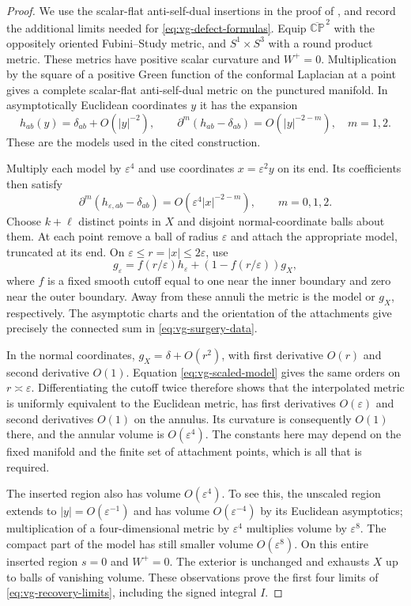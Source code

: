 \begin{proof}
We use the scalar-flat anti-self-dual insertions in the proof of
\cite[Theorem~4.3]{LeBrun2001}, and record the additional limits needed
for \eqref{eq:vg-defect-formulas}.  Equip
$\overline{\mathbb{CP}}^{\,2}$ with the oppositely oriented Fubini--Study
metric, and $S^1\times S^3$ with a round product metric.  These metrics
have positive scalar curvature and $W^+=0$.  Multiplication by the square
of a positive Green function of the conformal Laplacian at a point gives
a complete scalar-flat anti-self-dual metric on the punctured manifold.
In asymptotically Euclidean coordinates $y$ it has the expansion
\[
 h_{ab}(y)=\delta_{ab}+O(|y|^{-2}),\qquad
 \partial^m(h_{ab}-\delta_{ab})=O(|y|^{-2-m}),\quad m=1,2.
\]
These are the models used in the cited construction.

Multiply each model by $\varepsilon^4$ and use coordinates
$x=\varepsilon^2y$ on its end.  Its coefficients then satisfy
\begin{equation}\label{eq:vg-scaled-model}
 \partial^m(h_{\varepsilon,ab}-\delta_{ab})
       =O(\varepsilon^4|x|^{-2-m}),\qquad m=0,1,2.
\end{equation}
Choose $k+\ell$ distinct points in $X$ and disjoint normal-coordinate
balls about them.  At each point remove a ball of radius $\varepsilon$
and attach the appropriate model, truncated at its end.  On
$\varepsilon\leq r=|x|\leq2\varepsilon$, use
\[
 g_\varepsilon
   =f(r/\varepsilon)h_\varepsilon
       +(1-f(r/\varepsilon))g_X,
\]
where $f$ is a fixed smooth cutoff equal to one near the inner boundary
and zero near the outer boundary.  Away from these annuli the metric
is the model or $g_X$, respectively.  The asymptotic charts and the
orientation of the attachments give precisely the connected sum in
\eqref{eq:vg-surgery-data}.

In the normal coordinates, $g_X=\delta+O(r^2)$, with first derivative
$O(r)$ and second derivative $O(1)$.  Equation
\eqref{eq:vg-scaled-model} gives the same orders on $r\asymp\varepsilon$.
Differentiating the cutoff twice therefore shows that the interpolated
metric is uniformly equivalent to the Euclidean metric, has first
derivatives $O(\varepsilon)$ and second derivatives $O(1)$ on the
annulus.  Its curvature is consequently $O(1)$ there, and the annular
volume is $O(\varepsilon^4)$.  The constants here may depend on the
fixed manifold and the finite set of attachment points, which is all
that is required.

The inserted region also has volume $O(\varepsilon^4)$.  To see this,
the unscaled region extends to $|y|=O(\varepsilon^{-1})$ and has volume
$O(\varepsilon^{-4})$ by its Euclidean asymptotics; multiplication of a
four-dimensional metric by $\varepsilon^4$ multiplies volume by
$\varepsilon^8$.  The compact part of the model has still smaller
volume $O(\varepsilon^8)$.  On this entire inserted region $s=0$ and
$W^+=0$.  The exterior is unchanged and exhausts $X$ up to balls of
vanishing volume.  These observations prove the first four limits of
\eqref{eq:vg-recovery-limits}, including the signed integral $I$.


\end{proof}
